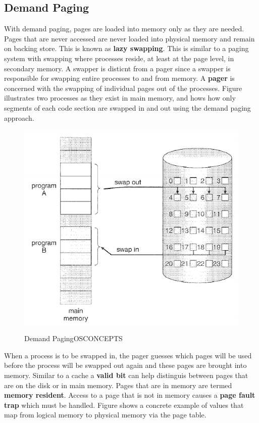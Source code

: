 \documentclass[10pt,a4paper]{article}
\begin{document}
\subsection{Demand Paging}
With demand paging, pages are loaded into memory only as they are needed. Pages that are never accessed are never loaded into physical memory and remain on backing store. This is known as {\bf lazy swapping}. This is similar to a paging system with swapping where processes reside, at least at the page level, in secondary memory. A swapper is disticnt from a pager since a swapper is responsible for swapping entire processes to and from memory. A {\bf pager} is concerned with the swapping of individual pages out of the processes. Figure \cite{demand-paging} illustrates two processes as they exist in main memory, and hows how only segments of each code section are swapped in and out using the demand paging approach. 
\begin{figure}
\caption{Demand Paging{OSCONCEPTS}}
\begin{center}
\includegraphics[scale=0.45]{../images/demand-paging.png}
\label{demand-paging}
\end{center}
\end{figure}
When a process is to be swapped in, the pager guesses which pages will be used before the process will be swapped out again and these pages are brought into memory. Similar to a cache a {\bf valid bit} can help distinguis between pages that are on the disk or in main memory.  Pages that are in memory are termed {\bf memory resident}. Access to a page that is not in memory causes a {\bf page fault trap} which must be handled. Figure \cite{demand-paging-exmaple} shows a concrete example of values that map from logical memory to physical memory via the page table. 
\end{document}
